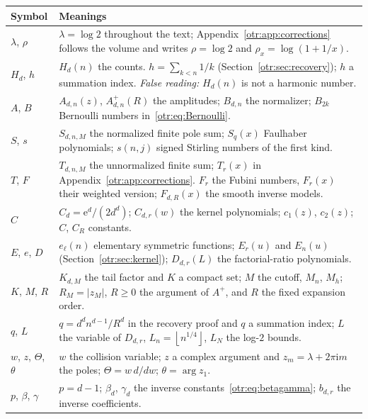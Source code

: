 \documentclass[11pt,a4paper]{article}
\theoremstyle{definition}\newtheorem{definition}[theorem]{Definition}
\theoremstyle{remark}\newtheorem{remark}[theorem]{Remark}
\newcommand{\lam}{\lambda}
\newcommand{\e}{\mathrm e}
\newcommand{\ii}{\mathrm i}
\newcommand{\floor}[1]{\left\lfloor #1\right\rfloor}
\begin{document}
\noindent\begin{tabular}{@{}>{\raggedright\arraybackslash}p{0.8in}>{\raggedright\arraybackslash}p{5.1in}@{}}
\toprule
Symbol & Meanings\\
\midrule
$\lam$, $\rho$ & $\lam=\log2$ throughout the text; Appendix~\ref{otr:app:corrections} follows the volume and writes $\rho=\log2$ and $\rho_x=\log(1+1/x)$.\\
$H_d$, $h$ & $H_d(n)$ the counts. $h=\sum_{k<n}1/k$ (Section~\ref{otr:sec:recovery}); $h$ a summation index. \emph{False reading:} $H_d(n)$ is not a harmonic number.\\
$A$, $B$ & $A_{d,n}(z)$, $A^+_{d,n}(R)$ the amplitudes; $B_{d,n}$ the normalizer; $B_{2k}$ Bernoulli numbers in~\eqref{otr:eq:Bernoulli}.\\
$S$, $s$ & $S_{d,n,M}$ the normalized finite pole sum; $S_q(x)$ Faulhaber polynomials; $s(n,j)$ signed Stirling numbers of the first kind.\\
$T$, $F$ & $T_{d,n,M}$ the unnormalized finite sum; $T_r(x)$ in Appendix~\ref{otr:app:corrections}. $F_r$ the Fubini numbers, $F_r(x)$ their weighted version; $F_{d,R}(x)$ the smooth inverse models.\\
$C$ & $C_d=\e^d/(2d^d)$; $C_{d,r}(w)$ the kernel polynomials; $c_1(z)$, $c_2(z)$; $C$, $C_R$ constants.\\
$E$, $e$, $D$ & $e_\ell(n)$ elementary symmetric functions; $E_r(u)$ and $E_n(u)$ (Section~\ref{otr:sec:kernel}); $D_{d,r}(L)$ the factorial-ratio polynomials.\\
$K$, $M$, $R$ & $K_{d,M}$ the tail factor and $K$ a compact set; $M$ the cutoff, $M_n$, $M_h$; $R_M=|z_M|$, $R\ge0$ the argument of $A^+$, and $R$ the fixed expansion order.\\
$q$, $L$ & $q=d^dn^{d-1}/R^d$ in the recovery proof and $q$ a summation index; $L$ the variable of $D_{d,r}$, $L_n=\floor{n^{1/4}}$, $L_N$ the log-$2$ bounds.\\
$w$, $z$, $\Theta$, $\theta$ & $w$ the collision variable; $z$ a complex argument and $z_m=\lam+2\pi\ii m$ the poles; $\Theta=w\,d/dw$; $\theta=\arg z_1$.\\
$p$, $\beta$, $\gamma$ & $p=d-1$; $\beta_d$, $\gamma_d$ the inverse constants~\eqref{otr:eq:betagamma}; $b_{d,r}$ the inverse coefficients.\\
\bottomrule
\end{tabular}
\endgroup
\end{document}
